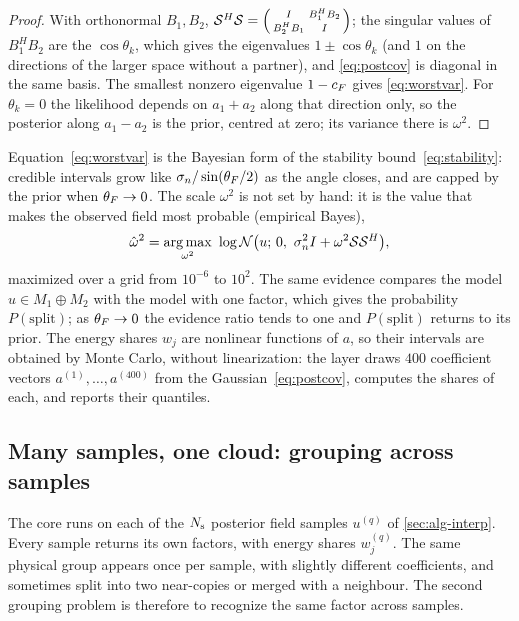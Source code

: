 \begin{proof}
With orthonormal $B_1,B_2$, $\mathcal{S}^H\mathcal{S}=\begin{psmallmatrix}I&B_1^HB_2\\B_2^HB_1&I\end{psmallmatrix}$; the singular
values of $B_1^HB_2$ are the $\cos\theta_k$, which gives the eigenvalues $1\pm\cos\theta_k$ (and $1$ on the
directions of the larger space without a partner), and \eqref{eq:postcov} is diagonal in the same basis. The
smallest nonzero eigenvalue $1-c_{F}$ gives
\eqref{eq:worstvar}. For $\theta_k=0$ the likelihood depends on $a_1+a_2$ along that direction only, so
the posterior along $a_1-a_2$ is the prior, centred at zero; its variance there is $\omega^2$.
\end{proof}

Equation~\eqref{eq:worstvar} is the Bayesian form of the stability bound~\eqref{eq:stability}: credible
intervals grow like $\sigma_{n}/\sin(\theta_{F}/2)$ as the angle closes, and are capped by the prior when
$\theta_{F}\to0$. The scale $\omega^2$ is not set by hand: it is the value that makes the observed field most probable
(empirical Bayes),
\[
  \hat\omega^2=\operatorname*{arg\,max}_{\omega^2}\ \log\Normal\big(u;\,0,\ \noise^2I+\omega^2\sumop\sumop^H\big),
\]
maximized over a grid from $10^{-6}$ to $10^{2}$. The same evidence compares the model
$u\in M_1\oplus M_2$ with the model with one factor, which gives the probability $P(\text{split})$; as
$\theta_{F}\to0$ the evidence ratio tends to one and $P(\text{split})$ returns to its prior. The energy shares $w_j$ are nonlinear functions of $a$, so their intervals are
obtained by Monte Carlo, without linearization: the layer draws $400$ coefficient vectors $a^{(1)},\dots,a^{(400)}$ from
the Gaussian~\eqref{eq:postcov}, computes the shares of each, and reports their quantiles.

\subsection{Many samples, one cloud: grouping across samples}\label{sec:bayes-cloud}
The core runs on each of the $N_{\mathrm s}$ posterior field samples $u^{(q)}$ of \cref{sec:alg-interp}. Every sample
returns its own factors, with energy shares $w_j^{(q)}$. The same physical group appears once per sample, with slightly different
coefficients, and sometimes split into two near-copies or merged with a neighbour. The second grouping
problem is therefore to recognize the same factor across samples.

